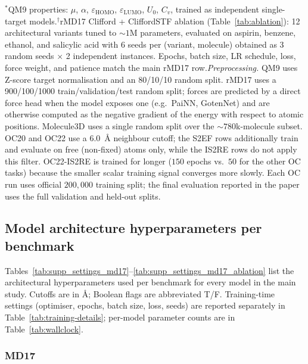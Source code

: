\begin{table}[t]
  \vspace{0.4em}
  \begin{minipage}{\linewidth}
    \footnotesize
    $^{\ast}$QM9 properties: $\mu$, $\alpha$, $\varepsilon_\mathrm{HOMO}$, $\varepsilon_\mathrm{LUMO}$, $U_0$, $C_v$, trained as independent single-target models.$^{\dagger}$rMD17 Clifford + CliffordSTF ablation (Table~\ref{tab:ablation}): 12 architectural variants tuned to ${\sim}1$M parameters, evaluated on aspirin, benzene, ethanol, and salicylic acid with 6 seeds per (variant, molecule) obtained as 3 random seeds $\times$ 2 independent instances. Epochs, batch size, LR schedule, loss, force weight, and patience match the main rMD17 row.\emph{Preprocessing.} QM9 uses Z-score target normalisation and an 80/10/10 random split. rMD17 uses a 900/100/1000 train/validation/test random split; forces are predicted by a direct force head when the model exposes one (e.g.\ PaiNN, GotenNet) and are otherwise computed as the negative gradient of the energy with respect to atomic positions. Molecule3D uses a single random split over the ${\sim}780$k-molecule subset. OC20 and OC22 use a $6.0$~\AA{} neighbour cutoff; the S2EF rows additionally train and evaluate on free (non-fixed) atoms only, while the IS2RE rows do not apply this filter. OC22-IS2RE is trained for longer ($150$ epochs vs.\ $50$ for the other OC tasks) because the smaller scalar training signal converges more slowly. Each OC run uses official $200{,}000$ training split; the final evaluation reported in the paper uses the full validation and held-out splits.
  \end{minipage}
\end{table}

\subsection{Model architecture hyperparameters per benchmark}\label{supp:model_settings}

Tables~\ref{tab:supp_settings_md17}--\ref{tab:supp_settings_md17_ablation} list the architectural hyperparameters used per benchmark for every model in the main study. Cutoffs are in \AA{}; Boolean flags are abbreviated T/F. Training-time settings (optimiser, epochs, batch size, loss, seeds) are reported separately in Table~\ref{tab:training-details}; per-model parameter counts are in Table~\ref{tab:wallclock}.

\subsubsection{MD17}

